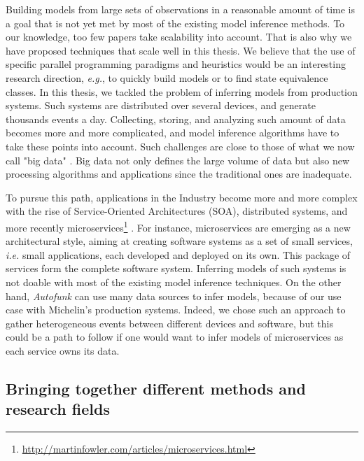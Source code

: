 Building models from large sets of observations in a reasonable
amount of time is a goal that is not yet met by most of the
existing model inference methods. To our knowledge, too few
papers \cite{Yang:2006:PMT:1134285.1134325,Pradel:2009} take
scalability into account. That is also why we have proposed
techniques that scale well in this thesis. We believe that the
use of specific parallel programming paradigms and heuristics
would be an interesting research direction, \emph{e.g.}, to
quickly build models or to find state equivalence classes. In
this thesis, we tackled the problem of inferring models from
production systems.  Such systems are distributed over several
devices, and generate thousands events a day. Collecting,
storing, and analyzing such amount of data becomes more and more
complicated, and model inference algorithms have to take these
points into account. Such challenges are close to those of what
we now call "big data" \cite{bigdata14}. Big data not only
defines the large volume of data but also new processing
algorithms and applications since the traditional ones are
inadequate.

To pursue this path, applications in the Industry become more and
more complex with the rise of Service-Oriented Architectures
(SOA), distributed systems, and more recently
microservices\footnote{\url{http://martinfowler.com/articles/microservices.html}}
\cite{thones2015microservices}.  For instance, microservices are
emerging as a new architectural style, aiming at creating
software systems as a set of small services, \emph{i.e.} small
applications, each developed and deployed on its own. This
package of services form the complete software system. Inferring
models of such systems is not doable with most of the existing
model inference techniques. On the other hand, \textit{Autofunk}
can use many data sources to infer models, because of our use
case with Michelin's production systems. Indeed, we chose such an
approach to gather heterogeneous events between different devices
and software, but this could be a path to follow if one would
want to infer models of microservices as each service owns its
data.

\subsection{Bringing together different methods and research
fields}

